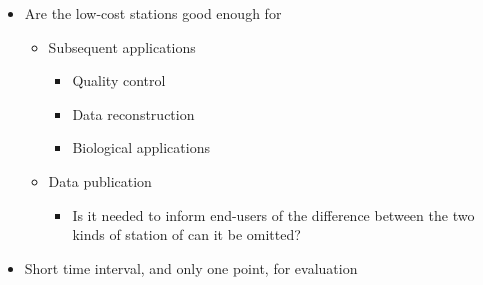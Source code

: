 \documentclass[authoryear,preprint,review,12pt]{elsarticle}
\begin{document}
\begin{itemize}
    \item Are the low-cost stations good enough for
    \begin{itemize}
        \item Subsequent applications
        \begin{itemize}
            \item Quality control
            \item Data reconstruction
            \item Biological applications
        \end{itemize}
        \item Data publication
        \begin{itemize}
            \item Is it needed to inform end-users of the difference between the two kinds of station of can it be omitted?
        \end{itemize}
    \end{itemize}
    \item Short time interval, and only one point, for evaluation
\end{itemize}







% 





\end{document}

